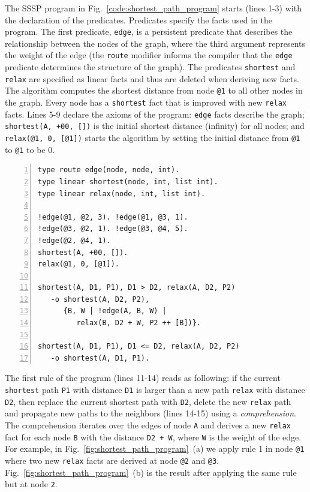 The SSSP program in Fig.~\ref{code:shortest_path_program} starts (lines 1-3)
with the declaration of the predicates. Predicates specify the facts
used in the program. The first predicate, \texttt{edge}, is a persistent
predicate that describes the relationship between the nodes of the graph,
where the third argument represents the weight of the edge (the
\texttt{route} modifier informs the compiler that the \texttt{edge} predicate
determines the structure of the graph).
The predicates \texttt{shortest} and \texttt{relax} are
specified as linear facts and thus are deleted when deriving new facts.  The
algorithm computes the shortest distance from node
\texttt{@1} to all other nodes in the graph. Every node has a
\texttt{shortest} fact that is improved with new \texttt{relax} facts.  Lines
5-9 declare the axioms of the program: \texttt{edge} facts describe the
graph; \texttt{shortest(A, +00, [])} is the initial shortest distance
(infinity) for all nodes; and \texttt{relax(@1, 0, [@1])} starts the
algorithm by setting the initial distance from \texttt{@1} to \texttt{@1} to be
0.

\begin{topfig}
\scriptsize\begin{Verbatim}[numbers=left]
type route edge(node, node, int).
type linear shortest(node, int, list int).
type linear relax(node, int, list int).

!edge(@1, @2, 3). !edge(@1, @3, 1).
!edge(@3, @2, 1). !edge(@3, @4, 5).
!edge(@2, @4, 1).
shortest(A, +00, []).
relax(@1, 0, [@1]).

shortest(A, D1, P1), D1 > D2, relax(A, D2, P2)
   -o shortest(A, D2, P2),
      {B, W | !edge(A, B, W) |
         relax(B, D2 + W, P2 ++ [B])}.

shortest(A, D1, P1), D1 <= D2, relax(A, D2, P2)
   -o shortest(A, D1, P1).
\end{Verbatim}
\end{topfig}
\normalsize

The first rule of the program (lines 11-14) reads as following: if the current
\texttt{shortest} path \texttt{P1} with distance \texttt{D1} is larger
than a new path \texttt{relax} with distance \texttt{D2}, then replace the
current shortest path with \texttt{D2}, delete the new \texttt{relax} path and
propagate new paths to the neighbors (lines 14-15) using a \emph{comprehension}.
The comprehension iterates over the edges of node \texttt{A} and derives a new
\texttt{relax} fact for each node \texttt{B} with the distance \texttt{D2 + W},
where \texttt{W} is the weight of the edge. For
example, in Fig.~\ref{fig:shortest_path_program}~(a) we apply rule 1 in node
\texttt{@1} where two new \texttt{relax} facts are derived at node \texttt{@2}
and \texttt{@3}. Fig.~\ref{fig:shortest_path_program}~(b) is the result after
applying the same rule but at node \texttt{2}.

